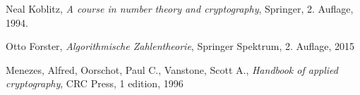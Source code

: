 \documentclass[
  a4paper,
  11pt,
]{scrartcl}
\theoremstyle{plain}
\theoremstyle{definition}
\theoremstyle{remark}
\begin{document}
\pagebreak

\listoffigures

\pagebreak

\begin{thebibliography}{9} 
    Neal Koblitz, 
    \textit{A course in number theory and cryptography}, 
    Springer, 
    2. Auflage, 
    1994. 
 
    Otto Forster, 
    \textit{Algorithmische Zahlentheorie}, 
    Springer Spektrum, 
    2. Auflage, 
    2015
    
    Menezes, Alfred,
    Oorschot, Paul C.,
    Vanstone, Scott A., 
    \textit{Handbook of applied cryptography}, 
    CRC Press, 
    1 edition, 
    1996 
 
\end{thebibliography}
\end{document}
